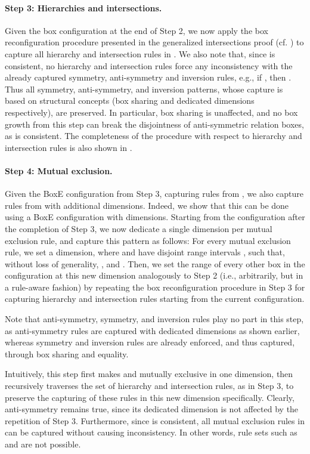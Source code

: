 \documentclass{article}
\begin{document}
\paragraph{Step 3: Hierarchies and intersections.} Given the box configuration at the end of Step 2, we now apply the box reconfiguration procedure presented in the generalized intersections proof (cf. ) to capture all hierarchy and intersection rules in . We also note that, since  is consistent, no hierarchy and intersection rules force any inconsistency with the already captured symmetry, anti-symmetry and inversion rules, e.g., if , then . Thus all symmetry, anti-symmetry, and inversion patterns, whose capture is based on structural concepts (box sharing and dedicated dimensions respectively), are preserved. In particular, box sharing is unaffected, and no box growth from this step can break the disjointness of anti-symmetric relation boxes, as  is consistent. The completeness of the procedure with respect to hierarchy and intersection rules is also shown in .


\paragraph{Step 4: Mutual exclusion.} 

Given the BoxE configuration from Step 3, capturing rules from , we also capture rules from  with additional dimensions. Indeed, we show that this can be done using a BoxE configuration with  dimensions. Starting from the configuration after the completion of Step 3, we now dedicate a single dimension per mutual exclusion rule, and capture this pattern as follows: For every mutual exclusion rule, we set a dimension, where  and  have disjoint range intervals , such that, without loss of generality, ,  and .  Then, we set the range of every other box in the configuration at this new dimension analogously to Step 2 (i.e., arbitrarily, but in a rule-aware fashion) by repeating the box reconfiguration procedure in Step 3 for capturing hierarchy and intersection rules starting from the current configuration. 

Note that anti-symmetry, symmetry, and inversion rules play no part in this step, as anti-symmetry rules are captured with dedicated dimensions as shown earlier, whereas symmetry and inversion rules are already enforced, and thus captured, through box sharing and equality.

Intuitively, this step first makes  and  mutually exclusive in one dimension, then recursively traverses the set of hierarchy and intersection rules, as in Step 3, to preserve the capturing of these rules in this new dimension specifically. Clearly, anti-symmetry remains true, since its dedicated dimension is not affected by the repetition of Step 3. Furthermore, since  is consistent, all mutual exclusion rules in  can be captured without causing inconsistency. In other words, rule sets such as  and  are not possible. 
\end{document}
